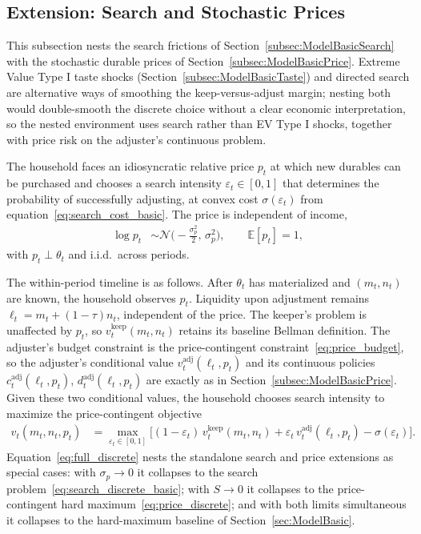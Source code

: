 \subsection{Extension: Search and Stochastic Prices}\label{subsec:ModelBasicFull}

This subsection nests the search frictions of Section~\ref{subsec:ModelBasicSearch} with the stochastic durable prices of Section~\ref{subsec:ModelBasicPrice}. Extreme Value Type I taste shocks (Section~\ref{subsec:ModelBasicTaste}) and directed search are alternative ways of smoothing the keep-versus-adjust margin; nesting both would double-smooth the discrete choice without a clear economic interpretation, so the nested environment uses search rather than EV Type I shocks, together with price risk on the adjuster's continuous problem.

The household faces an idiosyncratic relative price $p_t$ at which new durables can be purchased and chooses a search intensity $\varepsilon_t\in[0,1]$ that determines the probability of successfully adjusting, at convex cost $\sigma(\varepsilon_t)$ from equation~\eqref{eq:search_cost_basic}. The price is independent of income,
\begin{align}
	\log p_t &\sim \mathcal{N}\Big(-\frac{\sigma_p^2}{2},\,\sigma_p^2\Big), \qquad \mathbb{E}[p_t]=1, \label{eq:full_p_dist}
\end{align}
with $p_t\perp\theta_t$ and i.i.d.\ across periods.

The within-period timeline is as follows. After $\theta_t$ has materialized and $(m_t,n_t)$ are known, the household observes $p_t$. Liquidity upon adjustment remains $\ell_t=m_t+(1-\tau)n_t$, independent of the price. The keeper's problem is unaffected by $p_t$, so $v_t^{\text{keep}}(m_t,n_t)$ retains its baseline Bellman definition. The adjuster's budget constraint is the price-contingent constraint~\eqref{eq:price_budget}, so the adjuster's conditional value $v_t^{\text{adj}}(\ell_t,p_t)$ and its continuous policies $c_t^{\text{adj}}(\ell_t,p_t)$, $d_t^{\text{adj}}(\ell_t,p_t)$ are exactly as in Section~\ref{subsec:ModelBasicPrice}. Given these two conditional values, the household chooses search intensity to maximize the price-contingent objective
\begin{align}
	v_t(m_t,n_t,p_t)
	&= \max_{\varepsilon_t\in[0,1]}
	\Big[(1-\varepsilon_t)\, v_t^{\text{keep}}(m_t,n_t)
	+ \varepsilon_t\, v_t^{\text{adj}}(\ell_t,p_t)
	- \sigma(\varepsilon_t)\Big]. \label{eq:full_discrete}
\end{align}
Equation~\eqref{eq:full_discrete} nests the standalone search and price extensions as special cases: with $\sigma_p\to 0$ it collapses to the search problem~\eqref{eq:search_discrete_basic}; with $S\to 0$ it collapses to the price-contingent hard maximum~\eqref{eq:price_discrete}; and with both limits simultaneous it collapses to the hard-maximum baseline of Section~\ref{sec:ModelBasic}.

